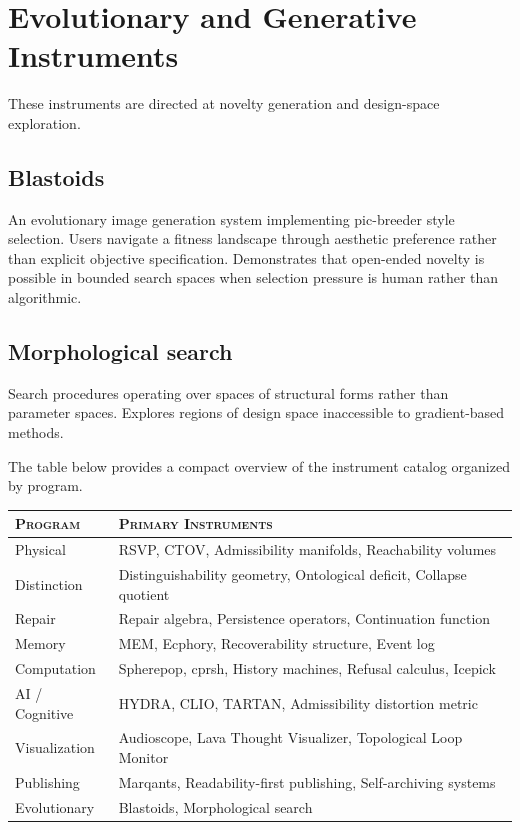 \documentclass[12pt, openany]{book}
\begin{document}
\section{Evolutionary and Generative Instruments}

These instruments are directed at novelty generation and design-space
exploration.

\subsection{Blastoids} An evolutionary image generation system implementing
pic-breeder style selection. Users navigate a fitness landscape through
aesthetic preference rather than explicit objective specification.
Demonstrates that open-ended novelty is possible in bounded search spaces
when selection pressure is human rather than algorithmic.

\subsection{Morphological search} Search procedures operating over spaces
of structural forms rather than parameter spaces. Explores regions of
design space inaccessible to gradient-based methods.

\bigskip\bigskip

\noindent The table below provides a compact overview of the instrument
catalog organized by program.

\bigskip

\begin{longtable}{@{} p{} p{} @{}}
\toprule
\textsc{Program} & \textsc{Primary Instruments} \\
\midrule
Physical & RSVP, CTOV, Admissibility manifolds, Reachability volumes \\[4pt]
Distinction & Distinguishability geometry, Ontological deficit, Collapse quotient \\[4pt]
Repair & Repair algebra, Persistence operators, Continuation function \\[4pt]
Memory & MEM\textbar8, Ecphory, Recoverability structure, Event log \\[4pt]
Computation & Spherepop, cprsh, History machines, Refusal calculus, Icepick \\[4pt]
AI / Cognitive & HYDRA, CLIO, TARTAN, Admissibility distortion metric \\[4pt]
Visualization & Audioscope, Lava Thought Visualizer, Topological Loop Monitor \\[4pt]
Publishing & Marqants, Readability-first publishing, Self-archiving systems \\[4pt]
Evolutionary & Blastoids, Morphological search \\
\bottomrule
\end{longtable}
\end{document}
